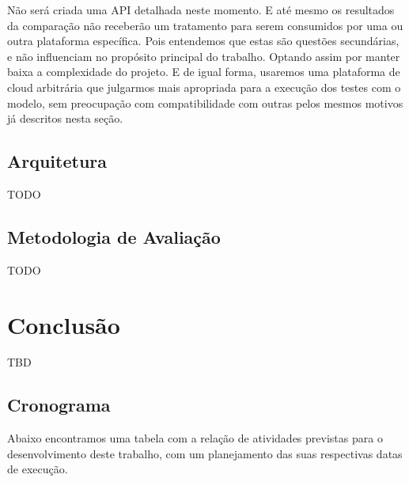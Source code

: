 \documentclass[twoside,english,brazilian]{UNISINOSmonografia}
\begin{document}
Não será criada uma API detalhada neste momento. E até mesmo os resultados da comparação não receberão um tratamento para serem consumidos por uma ou outra plataforma específica. Pois entendemos que estas são questões secundárias, e não influenciam no propósito principal do trabalho. Optando assim por manter baixa a complexidade do projeto. E de igual forma, usaremos uma plataforma de cloud arbitrária que julgarmos mais apropriada para a execução dos testes com o modelo, sem preocupação com compatibilidade com outras pelos mesmos motivos já descritos nesta seção.

\section{Arquitetura}

TODO

\section{Metodologia de Avaliação}
TODO



\chapter{Conclusão}
\label{conclusion}

TBD
\section{Cronograma}
Abaixo encontramos uma tabela com a relação de atividades previstas para o desenvolvimento deste trabalho, com um planejamento das suas respectivas datas de execução.
\end{document}
